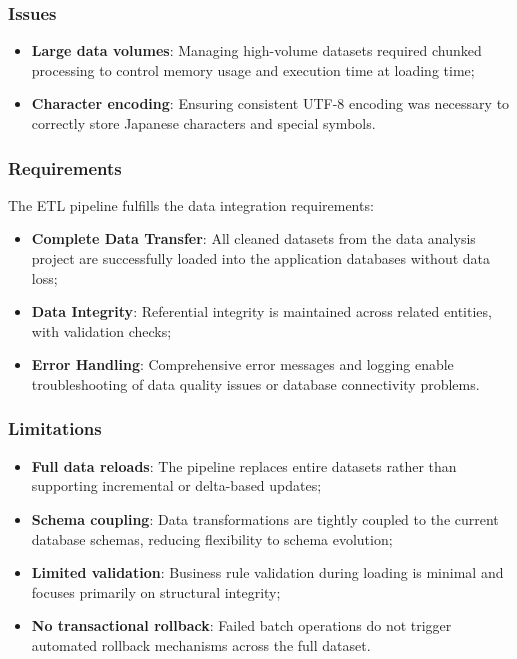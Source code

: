 \documentclass[11pt,a4paper]{article}
\begin{document}
\subsubsection{Issues}
\begin{itemize}
    \item \textbf{Large data volumes}: Managing high-volume datasets required chunked processing to control memory usage and execution time at loading time;
    \item \textbf{Character encoding}: Ensuring consistent UTF-8 encoding was necessary to correctly store Japanese characters and special symbols.
\end{itemize}

\subsubsection{Requirements}
The ETL pipeline fulfills the data integration requirements:
\begin{itemize}
    \item \textbf{Complete Data Transfer}: All cleaned datasets from the data analysis project are successfully loaded into the application databases without data loss;
    \item \textbf{Data Integrity}: Referential integrity is maintained across related entities, with validation checks;
    \item \textbf{Error Handling}: Comprehensive error messages and logging enable troubleshooting of data quality issues or database connectivity problems.
\end{itemize}

\subsubsection{Limitations}
\begin{itemize}
    \item \textbf{Full data reloads}: The pipeline replaces entire datasets rather than supporting incremental or delta-based updates;
    \item \textbf{Schema coupling}: Data transformations are tightly coupled to the current database schemas, reducing flexibility to schema evolution;
    \item \textbf{Limited validation}: Business rule validation during loading is minimal and focuses primarily on structural integrity;
    \item \textbf{No transactional rollback}: Failed batch operations do not trigger automated rollback mechanisms across the full dataset.
\end{itemize}
\end{document}

